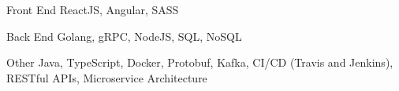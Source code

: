 


\begin{cvskills}


\cvskill
{Front End} %
{ReactJS, Angular, SASS} %


\cvskill
{Back End} %
{Golang, gRPC, NodeJS, SQL, NoSQL} %


\cvskill
{Other} %
{Java, TypeScript, Docker, Protobuf, Kafka, CI/CD (Travis and Jenkins), RESTful APIs, Microservice Architecture} %


\end{cvskills}
